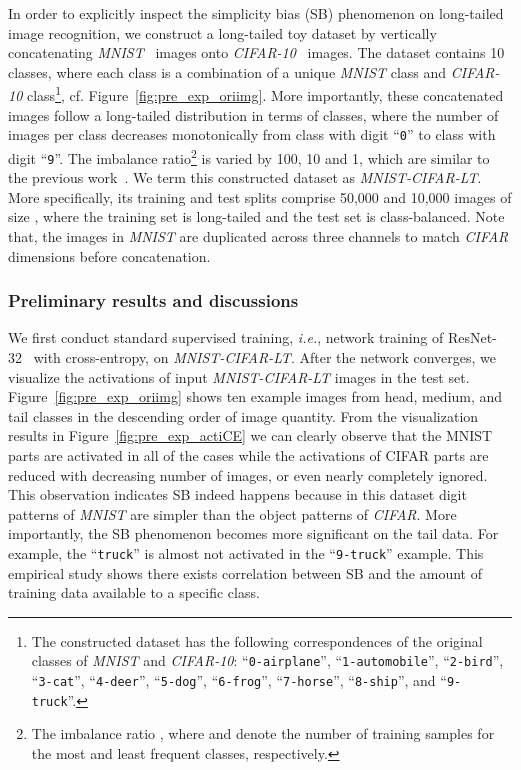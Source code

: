 \documentclass[10pt,journal,compsoc]{IEEEtran}
\newcommand{\ie}{\emph{i.e.}}
\begin{document}
In order to explicitly inspect the simplicity bias (SB) phenomenon on long-tailed image recognition, we construct a long-tailed toy dataset by vertically concatenating \emph{MNIST}~\cite{mnist} images onto \emph{CIFAR-10}~\cite{cifar} images. The dataset contains 10 classes, where each class is a combination of a unique \emph{MNIST} class and \emph{CIFAR-10} class\footnote{The constructed dataset has the following correspondences of the original classes of \emph{MNIST} and \emph{CIFAR-10}: ``\texttt{0-airplane}'', ``\texttt{1-automobile}'', ``\texttt{2-bird}'', ``\texttt{3-cat}'', ``\texttt{4-deer}'', ``\texttt{5-dog}'', ``\texttt{6-frog}'', ``\texttt{7-horse}'', ``\texttt{8-ship}'', and ``\texttt{9-truck}''.}, cf. Figure~\ref{fig:pre_exp_oriimg}. More importantly, these concatenated images follow a long-tailed distribution in terms of classes, where the number of images per class decreases monotonically from class with digit ``\texttt{0}'' to class with digit ``\texttt{9}''. The imbalance ratio\footnote{The imbalance ratio , where  and  denote the number of training samples for the most and least frequent classes, respectively.} 
is varied by 100, 10 and 1, which are similar to the previous work~\cite{cb-focal,ldam}. We term this constructed dataset as \emph{MNIST-CIFAR-LT}. More specifically, its training and test splits comprise 50,000 and 10,000 images of size , where the training set is long-tailed and the test set is class-balanced. Note that, the images in \emph{MNIST} are duplicated across three channels to match \emph{CIFAR} dimensions before concatenation.

\subsubsection{Preliminary results and discussions}

We first conduct standard supervised training, \ie, network training of ResNet-32~\cite{he2016deep} with cross-entropy, on \emph{MNIST-CIFAR-LT}. After the network converges, we visualize the activations of input \emph{MNIST-CIFAR-LT} images in the test set. Figure~\ref{fig:pre_exp_oriimg} shows ten example images from head, medium, and tail classes in the descending order of image quantity. From the visualization results in Figure~\ref{fig:pre_exp_actiCE} we can clearly observe that the MNIST parts are activated in all of the cases while the activations of CIFAR parts are reduced with decreasing number of images, or even nearly completely ignored. This observation indicates SB indeed happens because in this dataset digit patterns of \emph{MNIST} are simpler than the object patterns of \emph{CIFAR}. More importantly, the SB phenomenon becomes more significant on the tail data. For example, the ``\texttt{truck}'' is almost not activated in the ``\texttt{9-truck}'' example. This empirical study shows there exists correlation between SB and the amount of training data available to a specific class.
\end{document}
